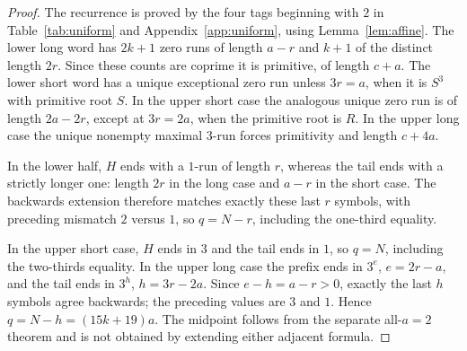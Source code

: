\documentclass[11pt]{article}
\theoremstyle{remark}\newtheorem{remark}[theorem]{Remark}
\begin{document}
\begin{proof}
The recurrence is proved by the four tags beginning with $2$ in Table~\ref{tab:uniform} and Appendix~\ref{app:uniform}, using Lemma~\ref{lem:affine}. The lower long word has $2k+1$ zero runs of length $a-r$ and $k+1$ of the distinct length $2r$. Since these counts are coprime it is primitive, of length $c+a$. The lower short word has a unique exceptional zero run unless $3r=a$, when it is $S^3$ with primitive root $S$. In the upper short case the analogous unique zero run is of length $2a-2r$, except at $3r=2a$, when the primitive root is $R$. In the upper long case the unique nonempty maximal $3$-run forces primitivity and length $c+4a$.

In the lower half, $H$ ends with a $1$-run of length $r$, whereas the tail ends with a strictly longer one: length $2r$ in the long case and $a-r$ in the short case. The backwards extension therefore matches exactly these last $r$ symbols, with preceding mismatch $2$ versus $1$, so $q=N-r$, including the one-third equality.

In the upper short case, $H$ ends in $3$ and the tail ends in $1$, so $q=N$, including the two-thirds equality. In the upper long case the prefix ends in $3^e$, $e=2r-a$, and the tail ends in $3^h$, $h=3r-2a$. Since $e-h=a-r>0$, exactly the last $h$ symbols agree backwards; the preceding values are $3$ and $1$. Hence $q=N-h=(15k+19)a$. The midpoint follows from the separate all-$a=2$ theorem and is not obtained by extending either adjacent formula.
\end{proof}
\end{document}
